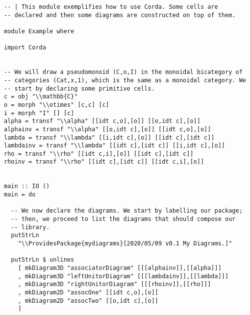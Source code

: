 \documentclass{article}
\begin{document}
\begin{verbatim}
-- | This module exemplifies how to use Corda. Some cells are
-- declared and then some diagrams are constructed on top of them.

module Example where

import Corda


-- We will draw a pseudomonoid (C,o,I) in the monoidal bicategory of
-- categories (Cat,x,1), which is the same as a monoidal category. We
-- start by declaring some primitive cells.
c = obj "\\mathbb{C}"
o = morph "\\otimes" [c,c] [c]
i = morph "I" [] [c]
alpha = transf "\\alpha" [[idt c,o],[o]] [[o,idt c],[o]]
alphainv = transf "\\alpha" [[o,idt c],[o]] [[idt c,o],[o]]
lambda = transf "\\lambda" [[i,idt c],[o]] [[idt c],[idt c]]
lambdainv = transf "\\lambda" [[idt c],[idt c]] [[i,idt c],[o]]
rho = transf "\\rho" [[idt c,i],[o]] [[idt c],[idt c]]
rhoinv = transf "\\rho" [[idt c],[idt c]] [[idt c,i],[o]]


main :: IO ()
main = do

  -- We now declare the diagrams. We start by labelling our package;
  -- then, we proceed to list the diagrams that should compose our
  -- library.
  putStrLn
    "\\ProvidesPackage{mydiagrams}[2020/05/09 v0.1 My Diagrams.]"

  putStrLn $ unlines
    [ mkDiagram3D "associatorDiagram" [[[alphainv]],[[alpha]]]
    , mkDiagram3D "leftUnitorDiagram" [[[lambdainv]],[[lambda]]]
    , mkDiagram3D "rightUnitorDiagram" [[[rhoinv]],[[rho]]]
    , mkDiagram2D "assocOne" [[idt c,o],[o]]
    , mkDiagram2D "assocTwo" [[o,idt c],[o]]
    ]
\end{verbatim}
\end{document}
